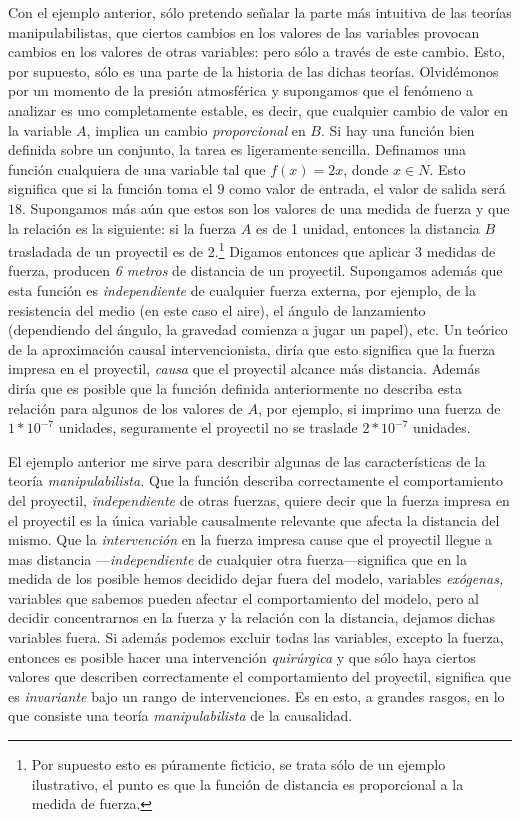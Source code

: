 Con el ejemplo anterior, sólo pretendo señalar la parte más intuitiva de las teorías manipulabilistas, que ciertos cambios en los valores de las variables provocan cambios en los valores de otras variables: pero sólo a través de este cambio. Esto, por supuesto, sólo es una parte de la historia de las dichas teorías. Olvidémonos por un momento de la presión atmosférica y supongamos que el fenómeno a analizar es uno completamente estable, es decir, que cualquier cambio de valor en la variable $ A $, implica un cambio \emph{proporcional} en $ B $. Si hay una función bien definida sobre un conjunto, la tarea es ligeramente sencilla. Definamos una función cualquiera de una variable tal que $ f( x ) = 2x $, donde $ x	\in{ N } $. Esto significa que si la función toma el $ 9 $ como valor de entrada, el valor de salida será $ 18 $. Supongamos más aún que estos son los valores de una medida de fuerza y que la relación es la siguiente: si la fuerza $ A $ es de 1 unidad, entonces la distancia $ B $ trasladada de un proyectil es de 2.\footnote{
	Por supuesto esto es púramente ficticio, se trata sólo de un ejemplo ilustrativo, el punto es que la función de distancia es proporcional a la medida de fuerza.
}
Digamos entonces que aplicar 3 medidas de fuerza, producen \emph{6 metros} de distancia de un proyectil. Supongamos además que esta función es \emph{independiente} de cualquier fuerza externa, por ejemplo, de la resistencia del medio (en este caso el aire), el ángulo de lanzamiento (dependiendo del ángulo, la gravedad comienza a jugar un papel), etc. Un teórico de la aproximación causal intervencionista, diría que esto significa que la fuerza impresa en el proyectil, \emph{causa} que el proyectil alcance más distancia. Además diría que es posible que la función definida anteriormente no describa esta relación para algunos de los valores de $ A $, por ejemplo, si imprimo una fuerza de $ 1*10^{ -7 } $ unidades, seguramente el proyectil no se traslade $ 2*10^{ -7 } $ unidades.

El ejemplo anterior me sirve para describir algunas de las características de la teoría \emph{manipulabilista.} Que la función
describa correctamente el comportamiento del proyectil,
\emph{independiente} de otras fuerzas, quiere decir que la fuerza
impresa en el proyectil es la única variable causalmente relevante
que afecta la distancia del mismo. Que la \emph{intervención} en la
fuerza impresa cause que el proyectil llegue a mas distancia
---\emph{independiente} de cualquier otra fuerza---significa que en
la medida de los posible hemos decidido dejar fuera del modelo,
variables \emph{exógenas,} variables que sabemos pueden afectar el comportamiento del modelo, pero al decidir concentrarnos en la fuerza y la relación con la distancia, dejamos dichas variables fuera. Si además podemos excluir todas las variables,
excepto la fuerza, entonces es posible hacer una intervención
\emph{quirúrgica} y que sólo haya ciertos valores que describen
correctamente el comportamiento del proyectil, significa que es
\emph{invariante} bajo un rango de intervenciones. Es en esto, a
grandes rasgos, en lo que consiste una teoría \emph{manipulabilista}
de la causalidad.

